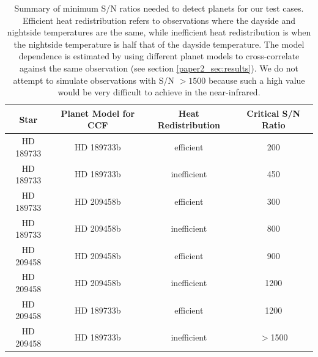 \begin{table}
  \centering
  \caption{Summary of minimum S/N ratios needed to detect planets for our test cases. Efficient heat redistribution refers to observations where the dayside and nightside temperatures are the same, while inefficient heat redistribution is when the nightside temperature is half that of the dayside temperature. The model dependence is estimated by using different planet models to cross-correlate against the same observation (see section \ref{paper2_sec:results}). We do not attempt to simulate observations with S/N $>1500$ because such a high value would be very difficult to achieve in the near-infrared.}
  \begin{tabular}{|c|ccc|}
    \hline
    Star & Planet Model for CCF & Heat Redistribution & Critical S/N Ratio \\ \hline
    HD 189733 & HD 189733b & efficient & 200 \\
    HD 189733 & HD 189733b & inefficient & 450 \\
    HD 189733 & HD 209458b & efficient & 300 \\
    HD 189733 & HD 209458b & inefficient & 800 \\
    HD 209458 & HD 209458b & efficient & 900 \\
    HD 209458 & HD 209458b & inefficient & 1200 \\
    HD 209458 & HD 189733b & efficient & 1200 \\
    HD 209458 & HD 189733b & inefficient & $>$1500 \\ \hline
  \end{tabular}
  \label{paper2_tab:snrcrit}
\end{table}




